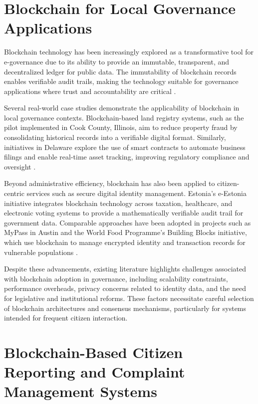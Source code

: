 \section{Blockchain for Local Governance Applications}

Blockchain technology has been increasingly explored as a transformative tool for e-governance due to its ability to provide an immutable, transparent, and decentralized ledger for public data. The immutability of blockchain records enables verifiable audit trails, making the technology suitable for governance applications where trust and accountability are critical \cite{hamill2018blockchain,goswami2020egovernance}.

Several real-world case studies demonstrate the applicability of blockchain in local governance contexts. Blockchain-based land registry systems, such as the pilot implemented in Cook County, Illinois, aim to reduce property fraud by consolidating historical records into a verifiable digital format. Similarly, initiatives in Delaware explore the use of smart contracts to automate business filings and enable real-time asset tracking, improving regulatory compliance and oversight \cite{goswami2020egovernance}.

Beyond administrative efficiency, blockchain has also been applied to citizen-centric services such as secure digital identity management. Estonia’s e-Estonia initiative integrates blockchain technology across taxation, healthcare, and electronic voting systems to provide a mathematically verifiable audit trail for government data. Comparable approaches have been adopted in projects such as MyPass in Austin and the World Food Programme’s Building Blocks initiative, which use blockchain to manage encrypted identity and transaction records for vulnerable populations \cite{hamill2018blockchain}.

Despite these advancements, existing literature highlights challenges associated with blockchain adoption in governance, including scalability constraints, performance overheads, privacy concerns related to identity data, and the need for legislative and institutional reforms. These factors necessitate careful selection of blockchain architectures and consensus mechanisms, particularly for systems intended for frequent citizen interaction.

\section{Blockchain-Based Citizen Reporting and Complaint Management Systems}

